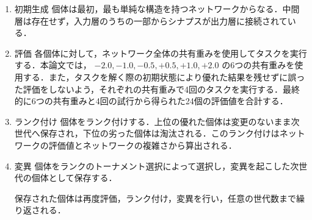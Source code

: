 \begin{enumerate}
    \item 初期生成
    個体は最初，最も単純な構造を持つネットワークからなる．中間層は存在せず，入力層のうちの一部からシナプスが出力層に接続されている．

    \item 評価
    各個体に対して，ネットワーク全体の共有重みを使用してタスクを実行する．本論文では， $ -2.0, -1.0, -0.5, +0.5, +1.0, +2.0 $ の6つの共有重みを使用する．また，タスクを解く際の初期状態により優れた結果を残せずに誤った評価をしないよう，それぞれの共有重みで4回のタスクを実行する．最終的に6つの共有重みと4回の試行から得られた24個の評価値を合計する．

    \item ランク付け
    個体をランク付けする．上位の優れた個体は変更のないまま次世代へ保存され，下位の劣った個体は淘汰される．このランク付けはネットワークの評価値とネットワークの複雑さから算出される．

    \item 変異
    個体をランクのトーナメント選択\cite{遺伝的アルゴリズム}によって選択し，変異を起こした次世代の個体として保存する．

    保存された個体は再度評価，ランク付け，変異を行い，任意の世代数まで繰り返される．
\end{enumerate}

